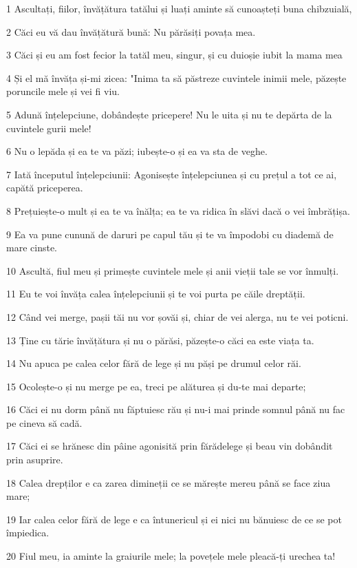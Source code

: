 \par 1 Ascultați, fiilor, învățătura tatălui și luați aminte să cunoașteți buna chibzuială,
\par 2 Căci eu vă dau învățătură bună: Nu părăsiți povața mea.
\par 3 Căci și eu am fost fecior la tatăl meu, singur, și cu duioșie iubit la mama mea
\par 4 Și el mă învăța și-mi zicea: "Inima ta să păstreze cuvintele inimii mele, păzește poruncile mele și vei fi viu.
\par 5 Adună înțelepciune, dobândește pricepere! Nu le uita și nu te depărta de la cuvintele gurii mele!
\par 6 Nu o lepăda și ea te va păzi; iubește-o și ea va sta de veghe.
\par 7 Iată începutul înțelepciunii: Agonisește înțelepciunea și cu prețul a tot ce ai, capătă priceperea.
\par 8 Prețuiește-o mult și ea te va înălța; ea te va ridica în slăvi dacă o vei îmbrățișa.
\par 9 Ea va pune cunună de daruri pe capul tău și te va împodobi cu diademă de mare cinste.
\par 10 Ascultă, fiul meu și primește cuvintele mele și anii vieții tale se vor înmulți.
\par 11 Eu te voi învăța calea înțelepciunii și te voi purta pe căile dreptății.
\par 12 Când vei merge, pașii tăi nu vor șovăi și, chiar de vei alerga, nu te vei poticni.
\par 13 Ține cu tărie învățătura și nu o părăsi, păzește-o căci ea este viața ta.
\par 14 Nu apuca pe calea celor fără de lege și nu păși pe drumul celor răi.
\par 15 Ocolește-o și nu merge pe ea, treci pe alăturea și du-te mai departe;
\par 16 Căci ei nu dorm până nu făptuiesc rău și nu-i mai prinde somnul până nu fac pe cineva să cadă.
\par 17 Căci ei se hrănesc din pâine agonisită prin fărădelege și beau vin dobândit prin asuprire.
\par 18 Calea drepților e ca zarea dimineții ce se mărește mereu până se face ziua mare;
\par 19 Iar calea celor fără de lege e ca întunericul și ei nici nu bănuiesc de ce se pot împiedica.
\par 20 Fiul meu, ia aminte la graiurile mele; la povețele mele pleacă-ți urechea ta!
